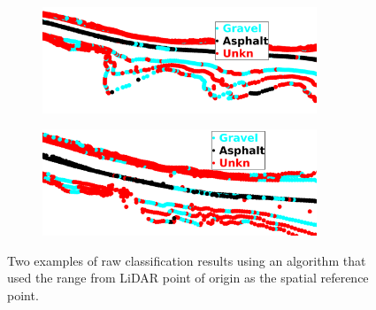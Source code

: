 \documentclass[numbered,pdftex]{ohio-etd}
\begin{document}
{{{		%
		\begin{figure}[H]
			\centering
			\begin{subfigure}[b]{\textwidth}
				\centering
				\includegraphics[width=0.9\textwidth]{Defense_Images/db_4_raw_range}
				\caption{}
				\label{fig:db_4_raw_range}
			\end{subfigure}
			\vspace{1cm} %
			\begin{subfigure}[b]{\textwidth}
				\centering
				\includegraphics[width=0.9\textwidth]{Defense_Images/db_6_raw_range}
				\caption{}
				\label{fig:db_6_raw_range}
			\end{subfigure}
			\caption[Raw Result Example - RANGE Spatial Reference Point]{Two examples of raw classification results using an algorithm that used the range from LiDAR point of origin as the spatial reference point. }
			\label{fig:range_raw_results_example}
		\end{figure}
		

}}}
\end{document}
